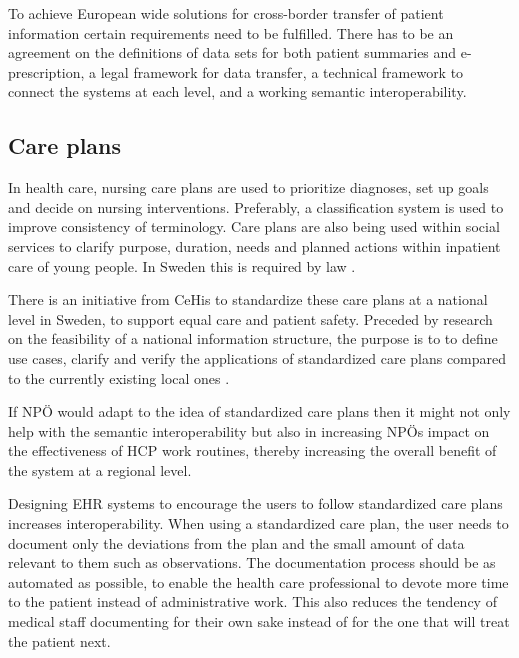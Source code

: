 \documentclass[14pt]{article}
\begin{document}
To achieve European wide solutions for cross-border transfer of patient information certain requirements need to be fulfilled. There has to be an agreement on the definitions of data sets for both patient summaries and e-prescription, a legal framework for data transfer, a technical framework to connect the systems at each level, and a working semantic \gls{interoperability}. \cite{epSOS1}

\subsection{Care plans}
In health care, nursing care plans are used to prioritize diagnoses, set up goals and decide on nursing interventions. Preferably, a classification system is used to improve consistency of terminology. Care plans are also being used within social services to clarify purpose, duration, needs and planned actions within inpatient care of young people. In Sweden this is required by law \cite{SocialServices}.

There is an initiative from \gls{CeHis} to standardize these care plans at a national level in Sweden, to support equal care and patient safety. Preceded by research on the feasibility of a national information structure, the purpose is to to define use cases, clarify and verify the applications of standardized care plans compared to the currently existing local ones \cite{CeHis}.

If NPÖ would adapt to the idea of standardized care plans then it might not only help with the semantic interoperability but also in increasing NPÖs impact on the effectiveness of HCP work routines, thereby increasing the overall benefit of the system at a regional level. \cite{Cambio}

Designing EHR systems to encourage the users to follow standardized care plans increases interoperability. When using a standardized care plan, the user needs to document only the deviations from the plan and the small amount of data relevant to them such as observations. The documentation process should be as automated as possible, to enable the health care professional to devote more time to the patient instead of administrative work. This also reduces the tendency of medical staff documenting for their own sake instead of for the one that will treat the patient next. \cite{Cambio}
\end{document}
